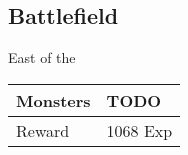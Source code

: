 \subsection{Battlefield}
\label{map:battlefield_18}

East of the 

\noindent\begin{tabularx}{\textwidth}[l]{lX}
	Monsters
	& TODO
\\ \hline
	Reward & 1068 Exp
\end{tabularx}
